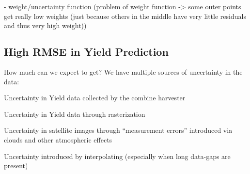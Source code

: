 {    - weight/uncertainty function 
    (problem of weight function -> some outer points get really low weights (just because others in the middle have very little residuals and thus very high weight))

    \subsection{High RMSE in Yield Prediction}{
        How much can we expect to get? We have multiple sources of uncertainty in the data:
        \begin{Nenumerate}
            \item Uncertainty in Yield data collected by the combine harvester
            \item Uncertainty in Yield data through rasterization
            \item Uncertainty in satellite images through ``measurement errors'' introduced via clouds and other atmospheric effects 
            \item Uncertainty introduced by interpolating (especially when long data-gaps are present)
        \end{Nenumerate}
    }
}
